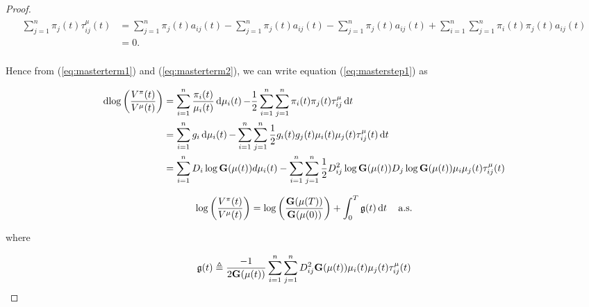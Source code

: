 \documentclass[british]{amsart} \usepackage{lmodern}
\numberwithin{equation}{section} \numberwithin{figure}{section}
\theoremstyle{plain} \newtheorem{thm}{\protect\theoremname}[section]
\theoremstyle{definition} \newtheorem{defn}[thm]{\protect\definitionname}
\theoremstyle{plain} \newtheorem{assumption}[thm]{\protect\assumptionname}
\theoremstyle{plain} \newtheorem{lem}[thm]{\protect\lemmaname}
\theoremstyle{plain} \newtheorem{prop}[thm]{\protect\propositionname}
\theoremstyle{remark} \newtheorem{rem}[thm]{\protect\remarkname}
\theoremstyle{plain} \newtheorem{cor}[thm]{\protect\corollaryname}
\renewcommand{\d}[1]{\mathop{\mathrm{d}{#1}}}
\begin{document}
\begin{proof}
\newcommand{\apii}{\sum_{j=1}^{n}\pi_{j}(t)a_{ij}(t)}
\newcommand{\apipi}{\sum_{i=1}^{n}\sum_{j=1}^{n}\pi_{i}(t)\pi_{j}(t)a_{ij}(t)}

  \begin{gather} 
    \begin{split} 
    \sum_{j=1}^{n} \pi_{j}(t) \tau_{ij}^{\mu} (t)
    &= 
    \sum_{j=1}^{n} \pi_{j}(t) a_{ij}(t) - \apii -
    \sum_{j=1}^{n} \pi_{j}(t) a_{ij}(t) + \apipi \\
    &= 0. \\
   \end{split} 
  \end{gather}

Hence from (\ref{eq:masterterm1}) and (\ref{eq:masterterm2}), we can write
equation (\ref{eq:masterstep1}) as

  \begin{gather} 
    \begin{split} 
      \d{ \log{ \left( \frac{V^{\pi}(t) }{ V^{\mu}(t) } \right) } } 
        &= 
            \sum_{i=1}^{n} \frac{\pi_{i}(t)}{\mu_{i}(t)} \d{\mu_{i}(t)} -
            \frac{1}{2}  \sum_{i=1}^{n} \sum_{j=1}^{n} 
            \pi_{i}(t)\pi_{j}(t)\tau_{ij}^{\mu}\d{t} \\
        &= \sum_{i=1}^{n} g_{i}\d{\mu_{i}(t)} -
            \sum_{i=1}^{n} \sum_{j=1}^{n} 
            \frac{1}{2} g_{i}(t)g_{j}(t)\mu_{i}(t)\mu_{j}(t)\tau_{ij}^{\mu}(t) \d{t} \\
        &= \sum_{i=1}^{n}  D_{i}\log{\Gmu} d{\mu_{i}(t)} -
            \sum_{i=1}^{n} \sum_{j=1}^{n} 
            \frac{1}{2} D_{ij}^2 \log{\Gmu} D_{j}\log{\Gmu} 
            \mu_{i}\mu_{j}(t)\tau_{ij}^{\mu}(t)
    \end{split} 
  \end{gather}

  \begin{equation}
    \label{eq:masterequation}
    \log \left( \frac{V^{\pi}(t)}{V^{\mu}(t)} \right) = 
    \log \left( \frac{\G{\mu(T)}}{\G{\mu(0)}} \right) + 
      \int_{0}^{T} \g \d{t}
    \quad \almostsurely
  \end{equation}

  where 

  \begin{equation}
    \mathfrak{g}(t) \triangleq \frac{-1}{2 \mathbf{G}(\mu(t))}
        \sum_{i=1}^{n} \sum_{j=1}^{n} D_{ij}^{2} \mathbf{G}(\mu(t)) 
        \mu_{i}(t) \mu_{j}(t)
        \tau_{ij}^{\mu}(t)
  \end{equation}
 

\end{proof}
\end{document}
